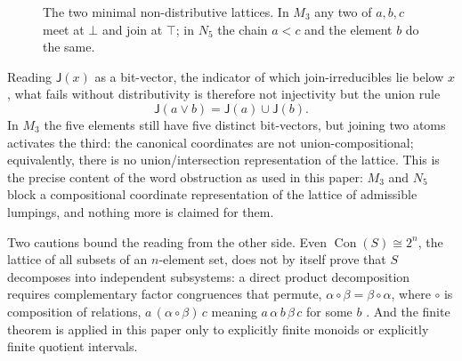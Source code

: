 \documentclass[10pt]{article}
\theoremstyle{definition}
\theoremstyle{remark}
\newcommand{\Con}{\operatorname{Con}}
\newcommand{\join}{\vee}
\newcommand{\J}{\mathsf{J}}
\begin{document}
\begin{figure}[ht]
\centering
{}
\caption{The two minimal non-distributive lattices.  In $M_3$ any two
of $a,b,c$ meet at $\bot$ and join at $\top$; in $N_5$ the chain
$a<c$ and the element $b$ do the same.}
\label{fig:m3n5}
\end{figure}

Reading $\J(x)$ as a bit-vector, the indicator of which
join-irreducibles lie below $x$, what fails without distributivity is
therefore not injectivity but the union rule
\[
  \J(a\join b)=\J(a)\cup\J(b).
\]
In $M_3$ the five elements still have five distinct bit-vectors, but
joining two atoms activates the third: the canonical coordinates are
not union-compositional; equivalently, there is no union/intersection
representation of the lattice.  This is the precise content of the
word obstruction as used in this paper: $M_3$ and $N_5$ block a
compositional coordinate representation of the lattice of admissible
lumpings, and nothing more is claimed for them.

Two cautions bound the reading from the other side.  Even
$\Con(S)\cong2^n$, the lattice of all subsets of an $n$-element set,
does not by itself prove that $S$ decomposes into independent
subsystems: a direct product decomposition requires complementary
factor congruences that permute,
$\alpha\circ\beta=\beta\circ\alpha$, where $\circ$ is composition of
relations, $a\,(\alpha\circ\beta)\,c$ meaning
$a\,\alpha\,b\,\beta\,c$ for some $b$
\cite[\S II.7]{BurrisSankappanavar1981}.  And the finite theorem is
applied in this paper only to explicitly finite monoids or explicitly
finite quotient intervals.
\end{document}
